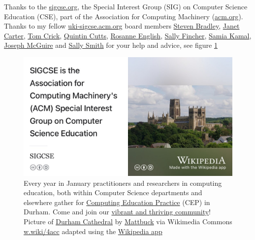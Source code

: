 \documentclass[
]{book}
\begin{document}
Thanks to the \href{https://www.sigcse.org}{sigcse.org}, the Special Interest Group (SIG) on Computer Science Education (CSE), part of the Association for Computing Machinery (\href{https://www.acm.org/}{acm.org}). Thanks to my fellow \href{https://uki-sigcse.acm.org/}{uki-sigcse.acm.org} board members \href{https://www.dur.ac.uk/research/directory/staff/?mode=staff\&id=106}{Steven Bradley}, \href{https://www.kent.ac.uk/computing/people/3101/carter-janet}{Janet Carter}, \href{https://proftomcrick.com/}{Tom Crick}, \href{https://www.gla.ac.uk/schools/computing/staff/quintincutts/}{Quintin Cutts}, \href{https://drrosanneenglish.github.io/}{Rosanne English}, \href{https://en.wikipedia.org/wiki/Sally_Fincher}{Sally Fincher}, \href{https://www.advance-he.ac.uk/ntfs/dr-samia-kamal}{Samia Kamal}, \href{https://www.gla.ac.uk/schools/computing/staff/josephmaguire/}{Joseph McGuire} and \href{https://www.napier.ac.uk/people/sally-smith}{Sally Smith} for your help and advice, see figure \ref{fig:sigcse-fig}

\begin{figure}

{\centering \includegraphics[width=0.99\linewidth]{images/sigcse} 

}

\caption{Every year in January practitioners and researchers in computing education, both within Computer Science departments and elsewhere gather for \href{https://cepconference.webspace.durham.ac.uk/}{Computing Education Practice} (CEP) in Durham. Come and join our \href{https://uki-sigcse.acm.org/practice/}{vibrant and thriving community}! Picture of \href{https://en.wikipedia.org/wiki/Durham_Cathedral}{Durham Cathedral} by \href{https://commons.wikimedia.org/wiki/User:Mattbuck}{Mattbuck} via Wikimedia Commons \href{https://w.wiki/4acc}{w.wiki/4acc} adapted using the \href{https://apps.apple.com/us/app/wikipedia/id324715238}{Wikipedia app}}\label{fig:sigcse-fig}
\end{figure}
\end{document}
